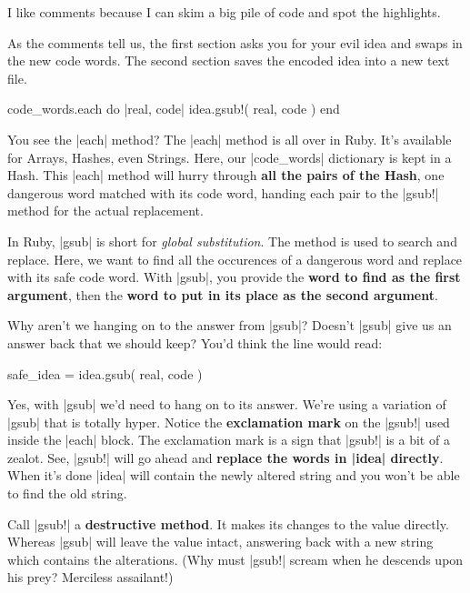 \documentclass[12pt,twoside]{report}
\begin{document}
I like comments because I can skim a big pile of code and spot the
highlights.

As the comments tell us, the first section asks you for your evil idea
and swaps in the new code words.  The second section saves the encoded
idea into a new text file.


\begin{rubycode}

 code_words.each do |real, code|
   idea.gsub!( real, code )
 end

\end{rubycode}

You see the \rubyinline|each| method?  The
\rubyinline|each| method is all over in Ruby.  It's
available for Arrays, Hashes, even Strings.  Here, our
\rubyinline|code_words| dictionary is kept in a Hash.
This \rubyinline|each| method will hurry through {\bf
  all the pairs of the Hash}, one dangerous word matched with its code
word, handing each pair to the \rubyinline|gsub!|
method for the actual replacement.

In Ruby, \rubyinline|gsub| is short for {\em global
  substitution}.  The method is used to search and replace. Here, we
want to find all the occurences of a dangerous word and replace with
its safe code word.  With \rubyinline|gsub|, you
provide the {\bf word to find as the first argument}, then the {\bf
  word to put in its place as the second argument}.

Why aren't we hanging on to the answer from
\rubyinline|gsub|?  Doesn't
\rubyinline|gsub| give us an answer back that we
should keep?  You'd think the line would read:


\begin{rubycode}

 safe_idea = idea.gsub( real, code )

\end{rubycode}


Yes, with \rubyinline|gsub| we'd need to hang on to
its answer.  We're using a variation of
\rubyinline|gsub| that is totally hyper.  Notice the
{\bf exclamation mark} on the \rubyinline|gsub!| used
inside the \rubyinline|each| block.  The exclamation
mark is a sign that \rubyinline|gsub!| is a bit of a
zealot.  See, \rubyinline|gsub!| will go ahead and
{\bf replace the words in \rubyinline|idea| directly}.
When it's done \rubyinline|idea| will contain the
newly altered string and you won't be able to find the old string.

Call \rubyinline|gsub!| a {\bf destructive method}.
It makes its changes to the value directly.  Whereas
\rubyinline|gsub| will leave the value intact,
answering back with a new string which contains the alterations. (Why
must \rubyinline|gsub!| scream when he descends upon
his prey?  Merciless assailant!)
\end{document}

